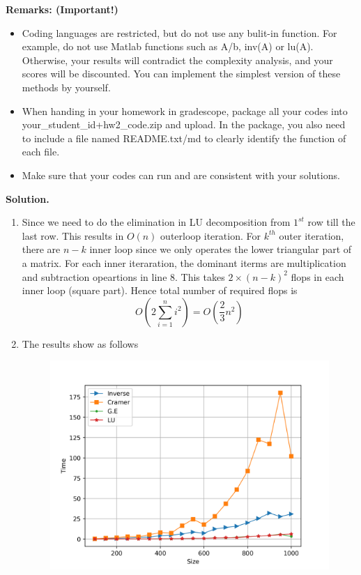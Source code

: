 \documentclass[english,onecolumn]{IEEEtran}
\begin{document}
\begin{enumerate}
\noindent\textbf{Remarks: (Important!)}
\begin{itemize}
    \item Coding languages are restricted, but do not use any bulit-in function. For example, do not use {\sf Matlab} functions such as {\sf A/b}, {\sf inv(A)} or {\sf lu(A)}. Otherwise, your results will contradict the complexity analysis, and your scores will be discounted. You can implement the simplest version of these methods by yourself.
    \item When handing in your homework in gradescope, package all your codes into {\sf your\_student\_id+hw2\_code.zip} and upload. In the package, you also need to include a file named {\sf README.txt/md} to clearly identify the function of each file.
     \item Make sure that your codes can run and are consistent with your solutions.
\end{itemize}
\end{enumerate} 

\noindent\textbf{Solution.}
\begin{enumerate}
    \item Since we need to do the elimination in LU decomposition from $1^{st}$ row till the last row. This results in $O(n)$ outerloop iteration. For $k^{th}$ outer iteration, there are $n-k$ inner loop since we only operates the lower triangular part of a matrix. For each inner iteraration, the dominant iterms are multiplication and subtraction opeartions in line 8. This takes $2\times (n-k)^2$ flops in each inner loop (square part). Hence total number of required flops is
    $$O(2\sum_{i=1}^n i^2) = O(\frac{2}{3}n^2)$$
    \item The results show as follows
\begin{figure}[htbp]
	\centering
	\includegraphics[width=15cm]{Plot.png}
\end{figure} 
\end{enumerate}
\end{document}
